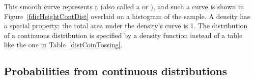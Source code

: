 This smooth curve represents a  (also called a  or ), and such a curve is shown in Figure~\ref{fdicHeightContDist} overlaid on a histogram of the sample. A density has a special property: the total area under the density's curve is 1. The distribution of a continuous distribution is specified by a density function instead of a table like the one in Table~\ref{distCoinTossing}.


\newpage

\subsection{Probabilities from continuous distributions}

